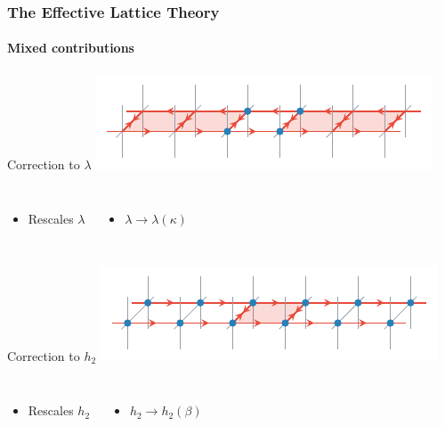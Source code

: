 \documentclass[12pt,a4paper,dvipsnames,usenames,handout]{beamer}
\begin{document}
\begin{frame}
  \frametitle{The Effective Lattice Theory}
  \framesubtitle{Mixed contributions}

  \begin{block}{Correction to $\lambda$}
    \centering
    \includegraphics{Figs/lambdarenorm.pdf}
    \vspace*{-.5em}

  \begin{columns}
  \begin{itemize}
    \item \color{LightUIBase} Rescales $\lambda$ 
  \end{itemize}
  \begin{itemize}
    \item \color{LightUIBase} $\lambda \to \lambda(\kappa)$
  \end{itemize}
  \end{columns}
  \end{block}
  

  \begin{block}{Correction to $h_2$}
  \centering
  \includegraphics{Figs/h2renorm.pdf}
  \vspace*{-.5em}

  \begin{columns}
  \begin{itemize}
    \item \color{LightUIBase} Rescales $h_2$ 
  \end{itemize}
  \begin{itemize}
    \item \color{LightUIBase} $h_2 \to h_2(\beta)$
  \end{itemize}
  \end{columns}
  \end{block}


\end{frame}
\end{document}
